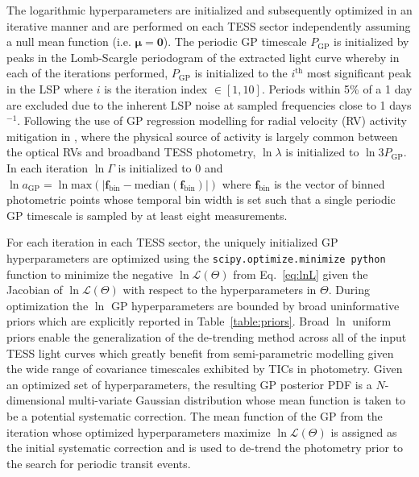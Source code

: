 The logarithmic hyperparameters are initialized and subsequently optimized in an iterative manner and
are performed on each TESS sector independently assuming a null mean function (i.e.
$\boldsymbol{\mu}=\mathbf{0}$).
The periodic GP timescale $P_{\text{GP}}$ is initialized by peaks in the Lomb-Scargle
periodogram \citep[LSP;][]{scargle82} of the extracted light curve whereby in each of the iterations
performed, $P_{\text{GP}}$ is initialized to the $i^{\text{th}}$ most significant peak in the LSP where $i$
is the iteration index $\in [1,10]$. Periods within 5\% of a 1 day are excluded due to the
inherent LSP noise at sampled frequencies close to 1 days$^{-1}$. Following the use of GP regression
modelling for radial velocity (RV) activity mitigation in \cite{dittmann17a}, where the physical source of
activity is largely common between the optical RVs and broadband TESS photometry,  
$\ln{\lambda}$ is initialized to $\ln{3P_{\text{GP}}}$. In each iteration $\ln{\Gamma}$ is initialized to
$0$ and $\ln{a_{\text{GP}}}=\ln{\text{max}(|\mathbf{f}_{\text{bin}} - \text{median}(\mathbf{f}_{\text{bin}})|)}$
where $\mathbf{f}_{\text{bin}}$ is the vector of binned photometric points whose temporal bin width is set
such that a single periodic GP timescale is sampled by at least eight measurements.

For each iteration in each TESS sector, the uniquely initialized GP hyperparameters are optimized
using the \texttt{scipy.optimize.minimize python} function to minimize the negative
$\ln{\mathcal{L}(\Theta)}$ from Eq.~\ref{eq:lnL}
given the Jacobian of $\ln{\mathcal{L}(\Theta)}$ with respect to the hyperparameters in
$\Theta$. During optimization the $\ln$ GP hyperparameters are bounded by broad uninformative priors
which are explicitly reported in Table~\ref{table:priors}. Broad $\ln$ uniform priors enable
the generalization of the \pipeline{} de-trending method across all of the input TESS light curves
which greatly benefit from semi-parametric modelling given the wide range of covariance timescales
exhibited by TICs in photometry.
Given an optimized set of hyperparameters, the resulting GP posterior PDF is a $N$-dimensional
multi-variate Gaussian distribution whose mean function is taken to be a potential systematic correction.
The mean function of the GP from the iteration whose optimized hyperparameters maximize
$\ln{\mathcal{L}(\Theta)}$ is assigned as the initial systematic
correction and is used to de-trend the photometry prior to the search for periodic transit events.



